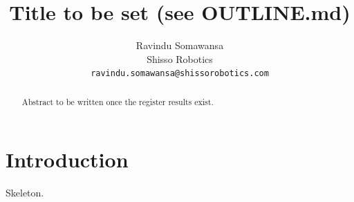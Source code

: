 \documentclass[10pt,twocolumn]{article}
\title{Title to be set (see OUTLINE.md)}
\author{Ravindu Somawansa\\Shisso Robotics\\\texttt{ravindu.somawansa@shissorobotics.com}}
\date{}
\begin{document}
\maketitle
\begin{abstract}Abstract to be written once the register results exist.\end{abstract}
\section{Introduction}
Skeleton.
\end{document}
